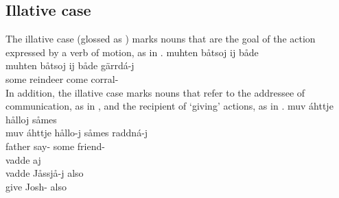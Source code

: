 \subsection{Illative case}\label{illative}
The illative case (glossed as \ILLs) marks nouns that are the goal of the action expressed by a verb of motion, as in . %
\ea\label{ill1}
\glll	muhten båtsoj ij både \\ %
	muhten båtsoj ij både gärrdá-j\\
	some reindeer\BS{}  come\BS{} corral-\\%
 
\z
In addition, the illative case marks nouns that refer to the addressee of communication, as in , and the recipient of ‘giving’ actions, as in .
\ea\label{ill2}
\glll	muv áhttje hålloj såmes \\
	muv áhttje hållo-j såmes raddná-j\\
	 father\BS{} say- some friend-\\\nopagebreak
{} 
\z
%
%
\ea\label{ill4}
\glll	vadde  aj \\
	vadde Jåssjå-j also \\
	give\BS{} Josh- also \\%
\z

